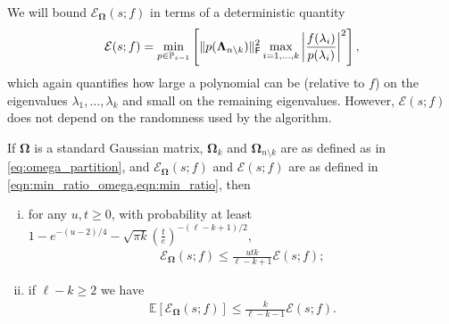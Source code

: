 We will bound $\mathcal{E}_{\bm{\Omega}}(s;f)$ in terms of a deterministic quantity
\begin{equation}
\label{eqn:min_ratio}
    \mathcal{E}(s;f) =
    \min\limits_{p \in \mathbb{P}_{s-1}}\left[\|p(\bm{\Lambda}_{n \setminus k}) \|_{\textsf{\textup{F}}}^2\max\limits_{i=1,\ldots,k} \left|\frac{f(\lambda_i)}{p(\lambda_i)}\right|^2\right] ,
\end{equation}
which again quantifies how large a polynomial can be (relative to $f$) on the eigenvalues $\lambda_1, \ldots, \lambda_k$ and small on the remaining eigenvalues. However, $\mathcal{E}(s;f)$ does not depend on the randomness used by the algorithm.
\begin{lemma}\label{lemma:probabilistic}
    If $\bm{\Omega}$ is a standard Gaussian matrix, $\bm{\Omega}_k$ and $\bm{\Omega}_{n \setminus k}$ are as defined as in \eqref{eq:omega_partition}, and $\mathcal{E}_{\bm{\Omega}}(s;f)$ and $\mathcal{E}(s;f)$ are as defined in \cref{eqn:min_ratio_omega,eqn:min_ratio}, then
    \begin{enumerate}[(i)]
        \item for any $u,t\geq 0$, with probability at least $1-e^{-(u-2)/4} - \sqrt{\pi k} \left(\frac{t}{e}\right)^{-(\ell -k + 1)/2}$,
        \begin{align*}
            \mathcal{E}_{\bm{\Omega}}(s;f)\leq \frac{ut k}{\ell - k + 1} \mathcal{E}(s;f);
        \end{align*}\label{item:tailbound}
        \item if $\ell -k \geq 2$ we have \begin{align*}
            \mathbb{E}[\mathcal{E}_{\bm{\Omega}}(s;f)] 
            \leq \frac{k}{\ell-k-1} \mathcal{E}(s;f).
        \end{align*}\label{item:expectationbound}
    \end{enumerate}
\end{lemma}
